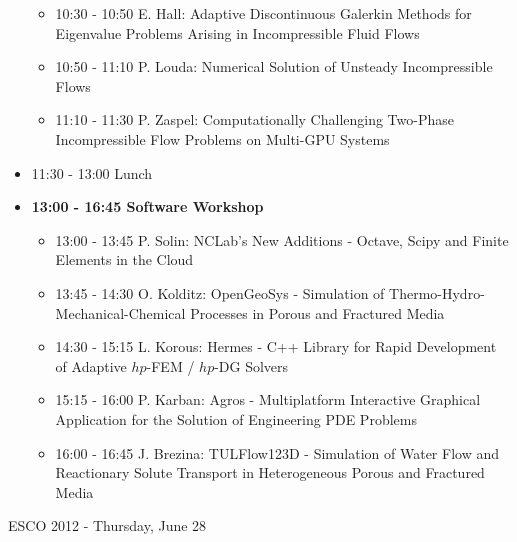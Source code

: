 \documentclass[10pt, A4]{article}%
\begin{document}
\begin{itemize}
\begin{itemize}
    \item 10:30 - 10:50 E. Hall: Adaptive Discontinuous Galerkin Methods for Eigenvalue Problems Arising in Incompressible Fluid Flows
    \item 10:50 - 11:10 P. Louda: Numerical Solution of Unsteady Incompressible Flows
    \item 11:10 - 11:30 P. Zaspel: Computationally Challenging Two-Phase Incompressible Flow Problems on Multi-GPU Systems
  \end{itemize}
  \item 11:30 - 13:00 Lunch
  \item {\bf 13:00 - 16:45 Software Workshop}
  \begin{itemize}
    \item 13:00 - 13:45 P. Solin: NCLab's New Additions - Octave, Scipy and Finite Elements in the Cloud
    \item 13:45 - 14:30 O. Kolditz: OpenGeoSys - Simulation of Thermo-Hydro-Mechanical-Chemical Processes in Porous and Fractured Media
    \item 14:30 - 15:15 L. Korous: Hermes - C++ Library for Rapid Development of Adaptive $hp$-FEM / $hp$-DG Solvers
    \item 15:15 - 16:00 P. Karban: Agros - Multiplatform Interactive Graphical Application for the Solution of Engineering PDE Problems
    \item 16:00 - 16:45 J. Brezina: TULFlow123D - Simulation of Water Flow and Reactionary Solute Transport in Heterogeneous Porous and Fractured Media
  \end{itemize}
\end{itemize}

\newpage

\centerline{\huge ESCO 2012 - Thursday, June 28}
\vspace{4mm}
\end{document}
